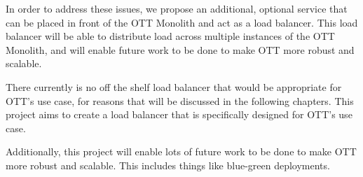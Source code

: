 In order to address these issues, we propose an additional, optional service that can be placed in front of the OTT Monolith and act as a load balancer. This load balancer will be able to distribute load across multiple instances of the OTT Monolith, and will enable future work to be done to make OTT more robust and scalable.

There currently is no off the shelf load balancer that would be appropriate for OTT's use case, for reasons that will be discussed in the following chapters. This project aims to create a load balancer that is specifically designed for OTT's use case.

Additionally, this project will enable lots of future work to be done to make OTT more robust and scalable. This includes things like blue-green deployments.
